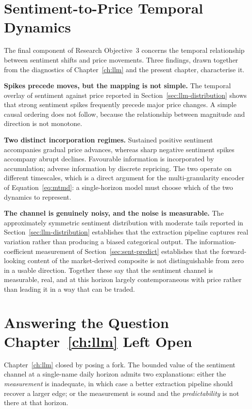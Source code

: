 \section{Sentiment-to-Price Temporal Dynamics}
\label{sec:sent-leadlag}

The final component of Research Objective~3 concerns the temporal relationship between sentiment
shifts and price movements. Three findings, drawn together from the diagnostics of
Chapter~\ref{ch:llm} and the present chapter, characterise it.

\textbf{Spikes precede moves, but the mapping is not simple.} The temporal overlay of sentiment
against price reported in Section~\ref{sec:llm-distribution} shows that strong sentiment spikes
frequently precede major price changes. A simple causal ordering does not follow, because the
relationship between magnitude and direction is not monotone.

\textbf{Two distinct incorporation regimes.} Sustained positive sentiment accompanies gradual
price advances, whereas sharp negative sentiment spikes accompany abrupt declines. Favourable
information is incorporated by accumulation; adverse information by discrete repricing. The two
operate on different timescales, which is a direct argument for the multi-granularity encoder of
Equation~\eqref{eq:mtmd}: a single-horizon model must choose which of the two dynamics to
represent.

\textbf{The channel is genuinely noisy, and the noise is measurable.} The approximately symmetric
sentiment distribution with moderate tails reported in Section~\ref{sec:llm-distribution}
establishes that the extraction pipeline captures real variation rather than producing a biased
categorical output. The information-coefficient measurement of Section~\ref{sec:sent-predict}
establishes that the forward-looking content of the market-derived composite is not
distinguishable from zero in a usable direction. Together these say that the sentiment channel is
measurable, real, and at this horizon largely contemporaneous with price rather than leading it in
a way that can be traded.

\section{Answering the Question Chapter~\ref{ch:llm} Left Open}
\label{sec:sent-answer}

Chapter~\ref{ch:llm} closed by posing a fork. The bounded value of the sentiment channel at a
single-name daily horizon admits two explanations: either the \emph{measurement} is inadequate, in
which case a better extraction pipeline should recover a larger edge; or the measurement is sound
and the \emph{predictability} is not there at that horizon.

